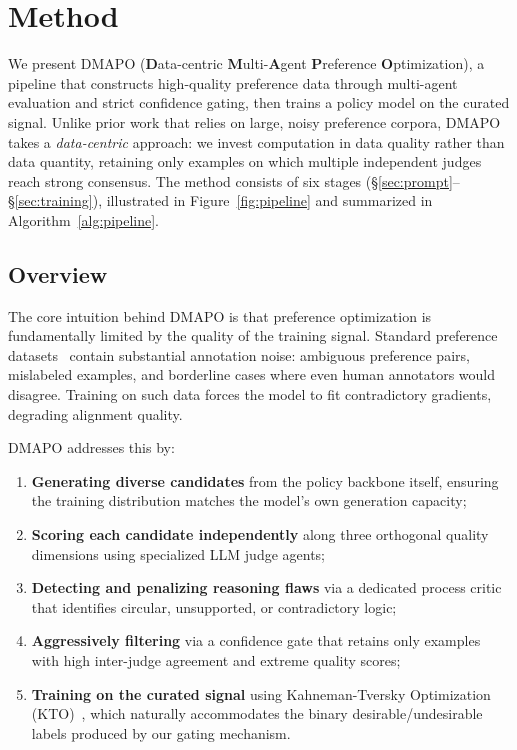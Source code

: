 \documentclass[10pt,twocolumn]{article}
\newcommand{\ours}{\textsc{DMAPO}}
\begin{document}
%
%

\section{Method}
\label{sec:method}

We present \ours{} (\textbf{D}ata-centric \textbf{M}ulti-\textbf{A}gent \textbf{P}reference \textbf{O}ptimization), a pipeline that constructs high-quality preference data through multi-agent evaluation and strict confidence gating, then trains a policy model on the curated signal.
Unlike prior work that relies on large, noisy preference corpora, \ours{} takes a \emph{data-centric} approach: we invest computation in data quality rather than data quantity, retaining only examples on which multiple independent judges reach strong consensus.
The method consists of six stages (\S\ref{sec:prompt}--\S\ref{sec:training}), illustrated in Figure~\ref{fig:pipeline} and summarized in Algorithm~\ref{alg:pipeline}.


\subsection{Overview}

The core intuition behind \ours{} is that preference optimization is fundamentally limited by the quality of the training signal.
Standard preference datasets~\cite{cui2023ultrafeedback,bai2022training} contain substantial annotation noise: ambiguous preference pairs, mislabeled examples, and borderline cases where even human annotators would disagree.
Training on such data forces the model to fit contradictory gradients, degrading alignment quality.

\ours{} addresses this by:
\begin{enumerate}[leftmargin=*,itemsep=1pt,topsep=2pt]
  \item \textbf{Generating diverse candidates} from the policy backbone itself, ensuring the training distribution matches the model's own generation capacity;
  \item \textbf{Scoring each candidate independently} along three orthogonal quality dimensions using specialized LLM judge agents;
  \item \textbf{Detecting and penalizing reasoning flaws} via a dedicated process critic that identifies circular, unsupported, or contradictory logic;
  \item \textbf{Aggressively filtering} via a confidence gate that retains only examples with high inter-judge agreement and extreme quality scores;
  \item \textbf{Training on the curated signal} using Kahneman-Tversky Optimization (KTO)~\cite{ethayarajh2024kto}, which naturally accommodates the binary desirable/undesirable labels produced by our gating mechanism.
\end{enumerate}
\end{document}
